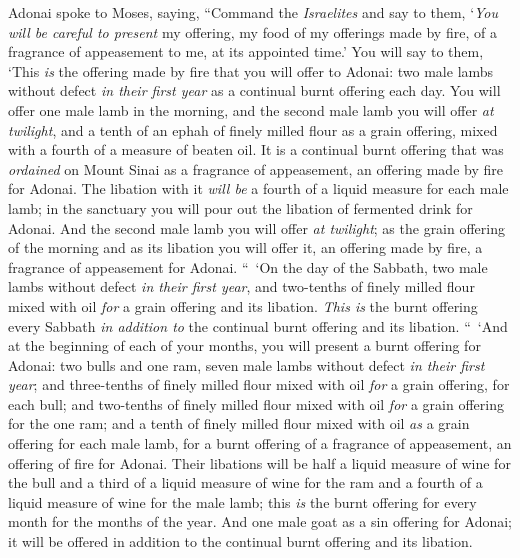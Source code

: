 \begin{biblechapter} %
 Adonai spoke to Moses, saying,
\verse “Command the \textit{Israelites} and say to them, ‘\textit{You will be careful to present} my offering, my food of my offerings made by fire, of a fragrance of appeasement to me, at its appointed time.’
\verse You will say to them, ‘This \textit{is} the offering made by fire that you will offer to Adonai: two male lambs without defect \textit{in their first year} as a continual burnt offering each day.
\verse You will offer one male lamb in the morning, and the second male lamb you will offer \textit{at twilight},
\verse and a tenth of an ephah of finely milled flour as a grain offering, mixed with a fourth of a measure of beaten oil.
\verse It is a continual burnt offering that was \textit{ordained} on Mount Sinai as a fragrance of appeasement, an offering made by fire for Adonai.
\verse The libation with it \textit{will be} a fourth of a liquid measure for each male lamb; in the sanctuary you will pour out the libation of fermented drink for Adonai.
\verse And the second male lamb you will offer \textit{at twilight}; as the grain offering of the morning and as its libation you will offer it, an offering made by fire, a fragrance of appeasement for Adonai.
\verse “ ‘On the day of the Sabbath, two male lambs without defect \textit{in their first year}, and two-tenths of finely milled flour mixed with oil \textit{for} a grain offering and its libation.
\verse \textit{This is} the burnt offering every Sabbath \textit{in addition to} the continual burnt offering and its libation.
\verse “ ‘And at the beginning of each of your months, you will present a burnt offering for Adonai: two bulls and one ram, seven male lambs without defect \textit{in their first year};
\verse and three-tenths of finely milled flour mixed with oil \textit{for} a grain offering, for each bull; and two-tenths of finely milled flour mixed with oil \textit{for} a grain offering for the one ram;
\verse and a tenth of finely milled flour mixed with oil \textit{as} a grain offering for each male lamb, for a burnt offering of a fragrance of appeasement, an offering of fire for Adonai.
\verse Their libations will be half a liquid measure of wine for the bull and a third of a liquid measure of wine for the ram and a fourth of a liquid measure of wine for the male lamb; this \textit{is} the burnt offering for every month for the months of the year.
\verse And one male goat as a sin offering for Adonai; it will be offered in addition to the continual burnt offering and its libation.

\end{biblechapter}
